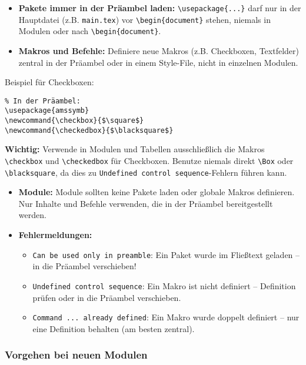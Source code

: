 \begin{itemize}
\tightlist
\item
  \textbf{Pakete immer in der Präambel laden:}
  \texttt{\textbackslash{}usepackage\{...\}} darf nur in der Hauptdatei (z.B. \texttt{main.tex}) vor \texttt{\textbackslash{}begin\{document\}} stehen, niemals in Modulen oder nach \texttt{\textbackslash{}begin\{document\}}.
\item
  \textbf{Makros und Befehle:}
  Definiere neue Makros (z.B. Checkboxen, Textfelder) zentral in der Präambel oder in einem Style-File, nicht in einzelnen Modulen.
\end{itemize}

Beispiel für Checkboxen:
\begin{verbatim}
% In der Präambel:
\usepackage{amssymb}
\newcommand{\checkbox}{$\square$}
\newcommand{\checkedbox}{$\blacksquare$}
\end{verbatim}

\textbf{Wichtig:} Verwende in Modulen und Tabellen ausschließlich die Makros \verb|\checkbox| und \verb|\checkedbox| für Checkboxen. Benutze niemals direkt \verb|\Box| oder \verb|\blacksquare|, da dies zu \texttt{Undefined control sequence}-Fehlern führen kann.

\begin{itemize}
\tightlist
\item
  \textbf{Module:}
  Module sollten keine Pakete laden oder globale Makros definieren.
  Nur Inhalte und Befehle verwenden, die in der Präambel bereitgestellt werden.
\item
  \textbf{Fehlermeldungen:}
  \begin{itemize}
  \tightlist
  \item
    \texttt{Can be used only in preamble}: Ein Paket wurde im Fließtext geladen -- in die Präambel verschieben!
  \item
    \texttt{Undefined control sequence}: Ein Makro ist nicht definiert -- Definition prüfen oder in die Präambel verschieben.
  \item
    \texttt{Command ... already defined}: Ein Makro wurde doppelt definiert -- nur eine Definition behalten (am besten zentral).
  \end{itemize}
\end{itemize}

\hypertarget{vorgehen-bei-neuen-modulen}{%
\subsubsection{Vorgehen bei neuen Modulen}\label{vorgehen-bei-neuen-modulen}}


